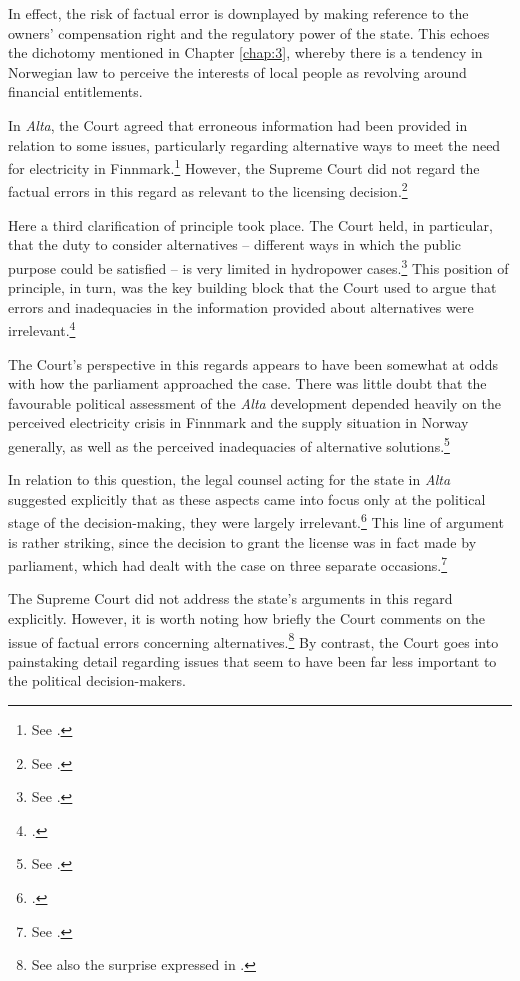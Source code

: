 In effect, the risk of factual error is downplayed by making reference to the owners' compensation right and the regulatory power of the state. This echoes the dichotomy mentioned in Chapter \ref{chap:3}, whereby there is a tendency in Norwegian law to perceive the interests of local people as revolving around financial entitlements.

In {\it Alta}, the Court agreed that erroneous information had been provided in relation to some issues, particularly regarding alternative ways to meet the need for electricity in Finnmark.\footnote{See \cite[346-357]{alta82}.} However, the Supreme Court did not regard the factual errors in this regard as relevant to the licensing decision.\footnote{See \cite[346]{alta82}.}

Here a third clarification of principle took place. The Court held, in particular, that the duty to consider alternatives -- different ways in which the public purpose could be satisfied -- is very limited in hydropower cases.\footnote{See \cite[346]{alta82}.} This position of principle, in turn, was the key building block that the Court used to argue that errors and inadequacies in the information provided about alternatives were irrelevant.\footcite[346]{alta82} 

The Court's perspective in this regards appears to have been somewhat at odds with how the parliament approached the case. There was little doubt that the favourable political assessment of the {\it Alta} development depended heavily on the perceived electricity crisis in Finnmark and the supply situation in Norway generally, as well as the perceived inadequacies of alternative solutions.\footnote{See \cite[338-347]{alta82}.}

In relation to this question, the legal counsel acting for the state in {\it Alta} suggested explicitly that as these aspects came into focus only at the political stage of the decision-making, they were largely irrelevant.\footcite[341]{alta82} This line of argument is rather striking, since the decision to grant the license was in fact made by parliament, which had dealt with the case on three separate occasions.\footnote{See \cite[342]{alta82}.}

The Supreme Court did not address the state's arguments in this regard explicitly. However, it is worth noting how briefly the Court comments on the issue of factual errors concerning alternatives.\footnote{See also the surprise expressed in \cite[349-351]{eckhoff82}.} By contrast, the Court goes into painstaking detail regarding issues that seem to have been far less important to the political decision-makers.

